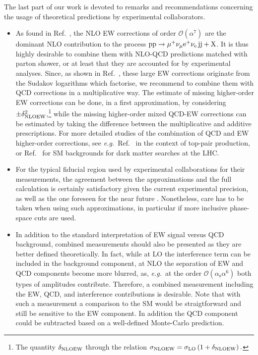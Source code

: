 \documentclass[twocolumn,epjc3]{svjour3} %
\newcommand{\Pj}{\ensuremath{\text{j}}\xspace}
\newcommand{\Pp}{\ensuremath{\text{p}}\xspace}
\newcommand{\alphas}{\ensuremath{\alpha_\text{s}}\xspace}
\begin{document}
The last part of our work is devoted to 
 remarks and recommendations concerning the usage of theoretical predictions by experimental collaborators.
\begin{itemize}
    \item As found in Ref.~\cite{Biedermann:2017bss}, the NLO EW corrections of order $\mathcal{O}{\left(\alpha^{7}\right)}$ are 
        the dominant NLO contribution to the process $\Pp\Pp\to\mu^+\nu_\mu{\rm e}^+\nu_{\rm e}\,\Pj\Pj+\mathrm{X}$.
        It is thus highly desirable to combine them with NLO-QCD predictions matched with parton shower, or at least that they are accounted for
        by experimental analyses. Since, as shown in Ref.~\cite{Biedermann:2016yds}, 
        these large EW corrections originate from the Sudakov logarithms which factorise, we recommend to combine them with QCD 
        corrections in a multiplicative way. The estimate of missing higher-order EW corrections can be done, 
        in a first approximation, by considering $\pm \delta^2_{\rm NLO EW}$,\footnote{The quantity $\delta_{\rm NLO EW}$ through the relation $\sigma_{\rm NLO EW} = \sigma_{\rm LO} \left(1+ \delta_{\rm NLO EW}\right).$} while the missing higher-order mixed QCD-EW corrections 
        can be estimated by taking the difference between the multiplicative and additive prescriptions.
        For more detailed studies of the combination of QCD and EW higher-order corrections, see
        \emph{e.g.}\, Ref.~\cite{Czakon:2017wor} in the context of top-pair production, or Ref.~\cite{Lindert:2017olm} for SM 
        backgrounds for dark matter searches at the LHC.
    \item For the typical fiducial region used by experimental collaborations for their measurements, 
        the agreement between the approximations and the full calculation is certainly satisfactory given 
        the current experimental precision, as well as the one foreseen for the near future \cite{CMSCollaboration:2015zni,CMS:2016rcn}.
        Nonetheless, care has to be taken when using such approximations, in particular if more inclusive phase-space cuts are used.

    \item In addition to the standard interpretation of EW signal versus QCD background, 
        combined measurements should also be presented as they are better defined theoretically. In fact, while at LO 
        the interference term can be included in the background component, at NLO the separation of EW and QCD components become more blurred, as, \emph{e.g.}\,
        at the order $\mathcal{O}{\left(\alphas\alpha^{6}\right)}$ both types of amplitudes contribute.
        Therefore, a combined measurement including the EW, QCD, and interference contributions is desirable.
        Note that with such a measurement a comparison to the SM would
        be straigtforward and still be sensitive to the EW component.
        In addition the QCD component could be subtracted based on a
        well-defined Monte-Carlo prediction.


\end{itemize}
\end{document}
